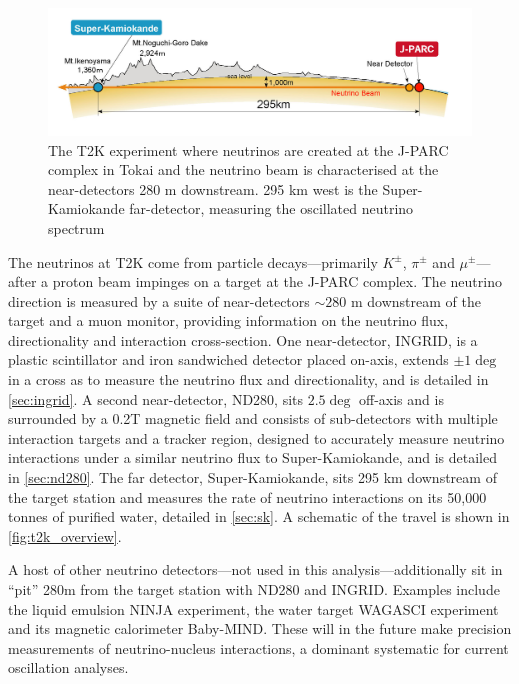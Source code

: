 \begin{figure}[h]
	\includegraphics[width=1.0\textwidth, trim={0mm 0mm 0mm 0mm}, clip,page=1]{figures/det_chap/view/t2k_overview}
	\caption{The T2K experiment where neutrinos are created at the J-PARC complex in Tokai and the neutrino beam is characterised at the near-detectors 280 m downstream. 295 km west is the Super-Kamiokande far-detector, measuring the oscillated neutrino spectrum}
	\label{fig:t2k_overview}
\end{figure}
The neutrinos at T2K come from particle decays---primarily $K^\pm$, $\pi^\pm$ and $\mu^\pm$---after a proton beam impinges on a target at the J-PARC complex. The neutrino direction is measured by a suite of near-detectors $\sim280$ m downstream of the target and a muon monitor, providing information on the neutrino flux, directionality and interaction cross-section. One near-detector, INGRID, is a plastic scintillator and iron sandwiched detector placed on-axis, extends $\pm1\deg$ in a cross as to measure the neutrino flux and directionality, and is detailed in \autoref{sec:ingrid}. A second near-detector, ND280, sits $2.5\deg$ off-axis and is surrounded by a 0.2T magnetic field and consists of sub-detectors with multiple interaction targets and a tracker region, designed to accurately measure neutrino interactions under a similar neutrino flux to Super-Kamiokande, and is detailed in \autoref{sec:nd280}. The far detector, Super-Kamiokande, sits 295 km downstream of the target station and measures the rate of neutrino interactions on its 50,000 tonnes of purified water, detailed in \autoref{sec:sk}. A schematic of the travel is shown in \autoref{fig:t2k_overview}.

A host of other neutrino detectors---not used in this analysis---additionally sit in ``pit'' 280m from the target station with ND280 and INGRID. Examples include the liquid emulsion NINJA experiment\cite{ninja}, the water target WAGASCI\cite{wagasci} experiment and its magnetic calorimeter Baby-MIND\cite{baby_mind}. These will in the future make precision measurements of neutrino-nucleus interactions, a dominant systematic for current oscillation analyses.

